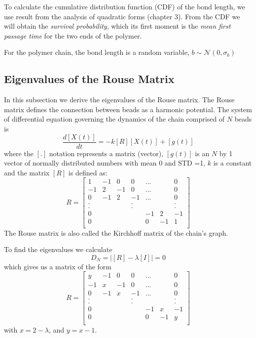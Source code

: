 \documentclass{report}
\begin{document}
To calculate the cumulative distribution function (CDF) of the bond length, we use result from the analysis of quadratic forms \cite{mathai1992quadratic} (chapter 3). From the CDF we will obtain the \textit{survival probability}, which its first moment is the \textit{mean first passage time} for the two ends of the polymer.

For the polymer chain, the bond length is a random variable, $b\sim \mathcal{N}(0,\sigma_b)$
\subsection{Eigenvalues of the Rouse Matrix}\label{subsection_eigenvaluesOfTheRouseMatrix}
In this subsection we derive the eigenvalues of the Rouse matrix. The Rouse matrix defines the connection between beads as a harmonic potential. The system of differential equation governing the dynamics of the chain comprised of $N$ beads is 
\begin{equation}
\frac{d[X(t)]}{dt}=-k[R][X(t)]+[g(t)]
\end{equation}
where the $[.]$ notation represents a matrix (vector), $[g(t)]$ is an $N$ by 1 vector of normally distributed numbers with mean 0 and STD =1, $k$ is a constant and the matrix $[R]$ is defined as:
\begin{equation}
R=\left[
\begin{matrix}
 1 & -1 &  0 &  0 &...&  &  0 \\
-1 &  2 & -1 &  0 &...&  &  0 \\
 0 & -1 &  2 & -1 &...&  &  0 \\
 . &    &    &  . &   &  &  . \\
 . &    &    &  . &   &  &  . \\
 0 &    &    &    & -1& 2& -1 \\
 0 &    &    &    &  0&-1&  1 \\     
\end{matrix}
\right]
\end{equation}
The Rouse matrix is also called the Kirchhoff matrix of the chain's graph.

To find the eigenvalues we calculate 
\begin{equation*}
D_N=\left|[R]-\lambda[I]\right|=0
\end{equation*}
which gives us a matrix of the form 
\begin{equation*}
R=\left[
\begin{matrix}
 y & -1 &  0 &  0 &...&  &  0 \\
-1 &  x & -1 &  0 &...&  &  0 \\
 0 & -1 &  x & -1 &...&  &  0 \\
 . &    &    &  . &   &  &  . \\
 . &    &    &  . &   &  &  . \\
 0 &    &    &    & -1& x& -1 \\
 0 &    &    &    &  0&-1&  y \\     
\end{matrix}
\right]
\end{equation*}
with $x=2-\lambda$, and $y=x-1$.
\end{document}
